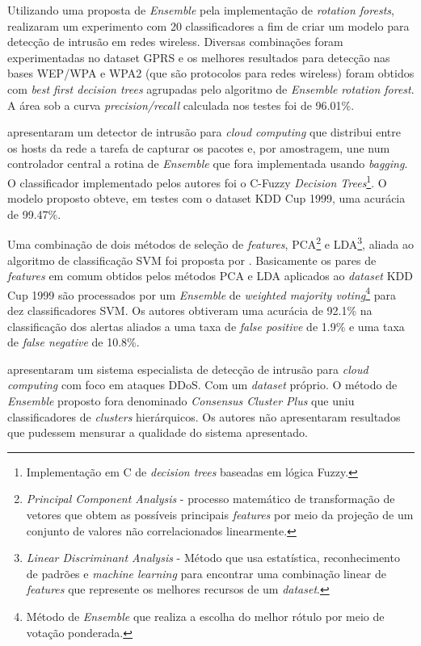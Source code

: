 Utilizando uma proposta de \textit{Ensemble} pela implementação de \textit{rotation forests},  realizaram um experimento com 20 classificadores a fim de criar um modelo para detecção de intrusão em redes wireless. Diversas combinações foram experimentadas no dataset GPRS e os melhores resultados para detecção nas bases WEP/WPA e WPA2 (que são protocolos para redes wireless) foram obtidos com \textit{best first decision trees} agrupadas pelo algoritmo de \textit{Ensemble} \textit{rotation forest}. A área sob a curva \textit{precision/recall} calculada nos testes foi de 96.01\%.

 apresentaram um detector de intrusão para \textit{cloud computing} que distribui entre os hosts da rede a tarefa de capturar os pacotes e, por amostragem, une num controlador central a rotina de \textit{Ensemble} que fora implementada usando \textit{bagging}. O classificador implementado pelos autores foi o C-Fuzzy \textit{Decision Trees}\footnote{Implementação em C de \textit{decision trees} baseadas em lógica Fuzzy.}. O modelo proposto obteve, em testes com o dataset KDD Cup 1999, uma acurácia de 99.47\%.



Uma combinação de dois métodos de seleção de \textit{features}, PCA\footnote{\textit{Principal Component Analysis} - processo matemático de transformação de vetores que obtem as possíveis principais \textit{features} por meio da projeção de um conjunto de valores não correlacionados linearmente.} e LDA\footnote{\textit{Linear Discriminant Analysis} - Método que usa estatística, reconhecimento de padrões e \textit{machine learning} para encontrar uma combinação linear de \textit{features} que represente os melhores recursos de um \textit{dataset}.}, aliada ao algoritmo de classificação SVM foi proposta por . Basicamente os pares de \textit{features} em comum obtidos pelos métodos PCA e LDA aplicados ao \textit{dataset} KDD Cup 1999 são processados por um \textit{Ensemble} de \textit{weighted majority voting}\footnote{Método de \textit{Ensemble} que realiza a escolha do melhor rótulo por meio de votação ponderada.} para dez classificadores SVM. Os autores obtiveram uma acurácia de 92.1\% na classificação dos alertas aliados a uma taxa de \textit{false positive} de 1.9\% e uma taxa de \textit{false negative} de 10.8\%.

 apresentaram um sistema especialista de detecção de intrusão para \textit{cloud computing} com foco em ataques DDoS. Com um \textit{dataset} próprio. O método de \textit{Ensemble} proposto fora denominado \textit{Consensus Cluster Plus} que uniu classificadores de \textit{clusters} hierárquicos. Os autores não apresentaram resultados que pudessem mensurar a qualidade do sistema apresentado.

